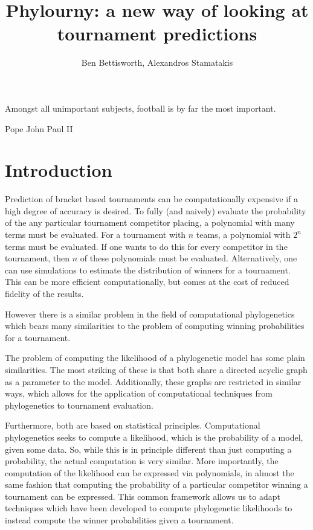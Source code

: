 \documentclass{article}
\title{Phylourny: a new way of looking at tournament predictions}
\author{Ben Bettisworth, Alexandros Stamatakis}
\begin{document}
\linenumbers
\doublespacing

\newcommand{\beats}[2]{P_{#1 \vdash #2}}

\maketitle
\epigraph{Amongst all unimportant subjects, football is by far the most important.}{Pope John Paul II}
\section{Introduction}

Prediction of bracket based tournaments can be computationally expensive if a high degree of accuracy is desired. To
fully (and naively) evaluate the probability of the any particular tournament competitor placing, a polynomial with many
terms must be evaluated. For a tournament with $n$ teams, a polynomial with $2^n$ terms must be evaluated. If one wants
to do this for every competitor in the tournament, then $n$ of these polynomials must be evaluated. Alternatively, one
can use simulations to estimate the distribution of winners for a tournament. This can be more efficient
computationally, but comes at the cost of reduced fidelity of the results.

However there is a similar problem in the field of computational phylogenetics which bears many similarities to the
problem of computing winning probabilities for a tournament. 

The problem of computing the likelihood of a phylogenetic model has some plain similarities. The most striking of these
is that both share a directed acyclic graph as a parameter to the model. Additionally, these graphs are restricted in
similar ways, which allows for the application of computational techniques from phylogenetics to tournament evaluation.

Furthermore, both are based on statistical principles. Computational phylogenetics seeks to compute a likelihood, which
is the probability of a model, given some data. So, while this is in principle different than just computing a
probability, the actual computation is very similar. More importantly, the computation of the likelihood can be
expressed via polynomials, in almost the same fashion that computing the probability of a particular competitor winning a
tournament can be expressed. This common framework allows us to adapt techniques which have been developed to compute
phylogenetic likelihoods to instead compute the winner probabilities given a tournament.
\end{document}
